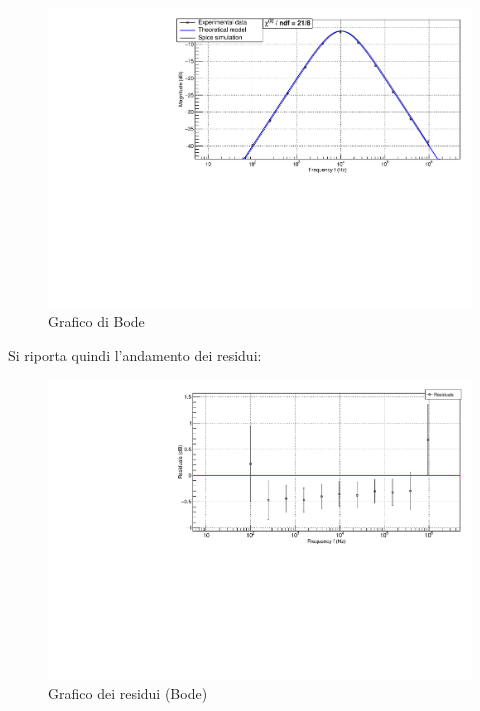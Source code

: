 \documentclass{article}
\begin{document}
\begin{center}
    \begin{figure}[H]
    \centering
    \includegraphics[scale=0.375, angle=0]{bodeshaper_no_pz.pdf}
    \caption{Grafico di Bode}
    \label{fig:bodeshaper_no_pz}
    \end{figure}
\end{center}

Si riporta quindi l'andamento dei residui:
\begin{center}
    \begin{figure}[H]
    \centering
    \includegraphics[scale=0.3875, angle=0]{bodeshaperresidui_no_pz.pdf}
    \caption{ Grafico dei residui (Bode)}
    \label{fig:bodeshaperresidui_no_pz}
    \end{figure}
\end{center}
\end{document}
